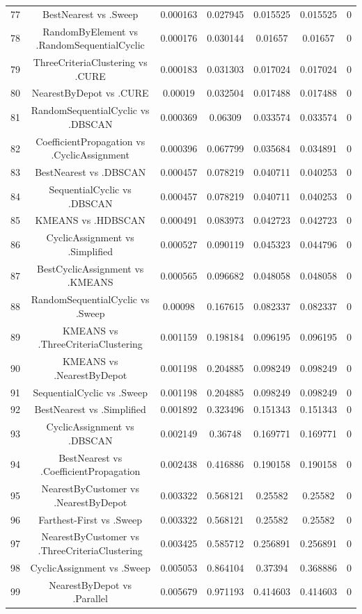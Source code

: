 \documentclass[a4paper,10pt]{article}
\begin{document}
\begin{landscape}
\begin{table}[!htp]
\begin{tabular}{ccccccc}
77&BestNearest vs .Sweep&0.000163&0.027945&0.015525&0.015525&0\\
78&RandomByElement vs .RandomSequentialCyclic&0.000176&0.030144&0.01657&0.01657&0\\
79&ThreeCriteriaClustering vs .CURE&0.000183&0.031303&0.017024&0.017024&0\\
80&NearestByDepot vs .CURE&0.00019&0.032504&0.017488&0.017488&0\\
81&RandomSequentialCyclic vs .DBSCAN&0.000369&0.06309&0.033574&0.033574&0\\
82&CoefficientPropagation vs .CyclicAssignment&0.000396&0.067799&0.035684&0.034891&0\\
83&BestNearest vs .DBSCAN&0.000457&0.078219&0.040711&0.040253&0\\
84&SequentialCyclic vs .DBSCAN&0.000457&0.078219&0.040711&0.040253&0\\
85&KMEANS vs .HDBSCAN&0.000491&0.083973&0.042723&0.042723&0\\
86&CyclicAssignment vs .Simplified&0.000527&0.090119&0.045323&0.044796&0\\
87&BestCyclicAssignment vs .KMEANS&0.000565&0.096682&0.048058&0.048058&0\\
88&RandomSequentialCyclic vs .Sweep&0.00098&0.167615&0.082337&0.082337&0\\
89&KMEANS vs .ThreeCriteriaClustering&0.001159&0.198184&0.096195&0.096195&0\\
90&KMEANS vs .NearestByDepot&0.001198&0.204885&0.098249&0.098249&0\\
91&SequentialCyclic vs .Sweep&0.001198&0.204885&0.098249&0.098249&0\\
92&BestNearest vs .Simplified&0.001892&0.323496&0.151343&0.151343&0\\
93&CyclicAssignment vs .DBSCAN&0.002149&0.36748&0.169771&0.169771&0\\
94&BestNearest vs .CoefficientPropagation&0.002438&0.416886&0.190158&0.190158&0\\
95&NearestByCustomer vs .NearestByDepot&0.003322&0.568121&0.25582&0.25582&0\\
96&Farthest-First vs .Sweep&0.003322&0.568121&0.25582&0.25582&0\\
97&NearestByCustomer vs .ThreeCriteriaClustering&0.003425&0.585712&0.256891&0.256891&0\\
98&CyclicAssignment vs .Sweep&0.005053&0.864104&0.37394&0.368886&0\\
99&NearestByDepot vs .Parallel&0.005679&0.971193&0.414603&0.414603&0\\

\end{tabular}
\end{table}
\end{landscape}
\end{document}

